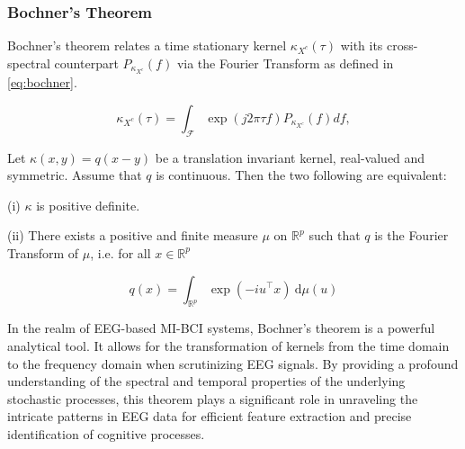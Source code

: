 \subsubsection{Bochner's Theorem}

Bochner’s theorem relates a time stationary kernel $\kappa_{X^c}(\tau)$ with its cross-spectral counterpart $P_{\kappa_{X^c}}(f)$ via the Fourier Transform as defined in \cref{eq:bochner}.

\begin{linenomath*}
	\begin{equation}\label{eq:bochner}
		\kappa_{X^c}(\tau) = \int_{\mathscr{F}} \exp{(j2\pi \tau {f})} P_{\kappa_{X^c}}(f)d{f},
	\end{equation}
\end{linenomath*}

\begin{theorem}
Let $\kappa(x, y)=q(x-y)$ be a translation invariant kernel, real-valued and symmetric. Assume that $q$ is continuous. Then the two following are equivalent:

(i) $\kappa$ is positive definite.

(ii) There exists a positive and finite measure $\mu$ on $\mathbb{R}^{p}$ such that $q$ is the Fourier Transform of $\mu$, i.e. for all $x \in \mathbb{R}^{p}$

\begin{equation}
q(x)=  \int_{\mathbb{R}^{p}} \exp\left({-i u^{\top} x} \right) \mathrm{~d} \mu(u)
\end{equation}
\end{theorem}

In the realm of EEG-based MI-BCI systems, Bochner's theorem is a powerful analytical tool. It allows for the transformation of kernels from the time domain to the frequency domain when scrutinizing EEG signals. By providing a profound understanding of the spectral and temporal properties of the underlying stochastic processes, this theorem plays a significant role in unraveling the intricate patterns in EEG data for efficient feature extraction and precise identification of cognitive processes.

